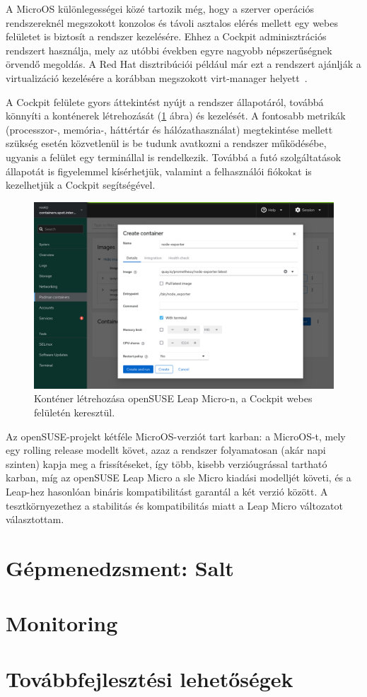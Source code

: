 A MicroOS különlegességei közé tartozik még, hogy a szerver operációs rendszereknél megszokott konzolos és távoli asztalos elérés mellett egy webes felületet is biztosít a rendszer kezelésére. Ehhez a Cockpit adminisztrációs rendszert használja, mely az utóbbi években egyre nagyobb népszerűségnek örvendő megoldás. A Red Hat disztribúciói például már ezt a rendszert ajánlják a virtualizáció kezelésére a korábban megszokott virt-manager helyett~\cite{RHELDeprecated}.

A Cockpit felülete gyors áttekintést nyújt a rendszer állapotáról, továbbá könnyíti a konténerek létrehozását (\ref{fig:cockpit-container} ábra) és kezelését. A fontosabb metrikák (processzor-, memória-, háttértár és hálózathasználat) megtekintése mellett szükség esetén közvetlenül is be tudunk avatkozni a rendszer működésébe, ugyanis a felület egy terminállal is rendelkezik. Továbbá a futó szolgáltatások állapotát is figyelemmel kísérhetjük, valamint a felhasználói fiókokat is kezelhetjük a Cockpit segítségével.

\begin{figure}
	\centering
	\includegraphics[width=15cm]{figures/cockpit.png}
	\caption{Konténer létrehozása openSUSE Leap Micro-n, a Cockpit webes felületén keresztül.}
	\label{fig:cockpit-container}
\end{figure}

Az openSUSE-projekt kétféle MicroOS-verziót tart karban: a MicroOS-t, mely egy rolling release modellt követ, azaz a rendszer folyamatosan (akár napi szinten) kapja meg a frissítéseket, így több, kisebb verzióugrással tartható karban, míg az openSUSE Leap Micro a \acrlong{sle} Micro kiadási modelljét követi, és a Leap-hez hasonlóan bináris kompatibilitást garantál a két verzió között. A tesztkörnyezethez a stabilitás és kompatibilitás miatt a Leap Micro változatot választottam.




\section{Gépmenedzsment: Salt}


\section{Monitoring}

\section{Továbbfejlesztési lehetőségek}